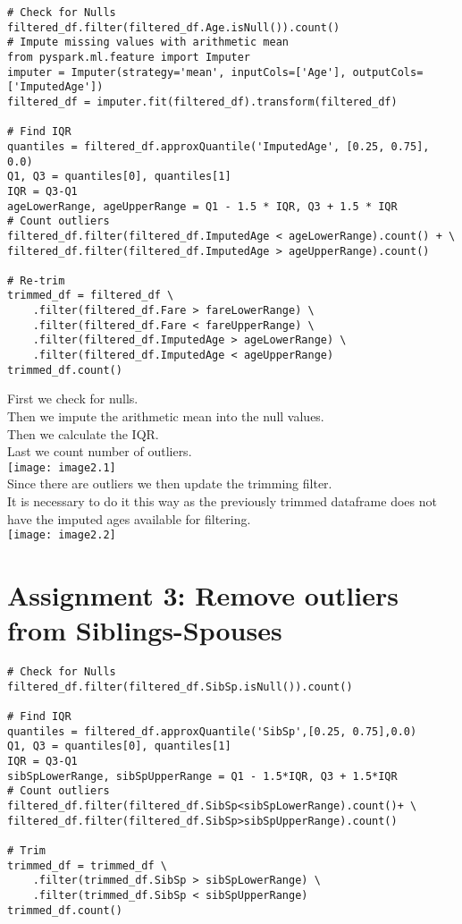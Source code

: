 \documentclass[]{article}
\begin{document}
\begin{verbatim}
# Check for Nulls
filtered_df.filter(filtered_df.Age.isNull()).count()
# Impute missing values with arithmetic mean
from pyspark.ml.feature import Imputer
imputer = Imputer(strategy='mean', inputCols=['Age'], outputCols=['ImputedAge'])
filtered_df = imputer.fit(filtered_df).transform(filtered_df)

# Find IQR 
quantiles = filtered_df.approxQuantile('ImputedAge', [0.25, 0.75], 0.0)
Q1, Q3 = quantiles[0], quantiles[1]
IQR = Q3-Q1
ageLowerRange, ageUpperRange = Q1 - 1.5 * IQR, Q3 + 1.5 * IQR
# Count outliers
filtered_df.filter(filtered_df.ImputedAge < ageLowerRange).count() + \
filtered_df.filter(filtered_df.ImputedAge > ageUpperRange).count()

# Re-trim
trimmed_df = filtered_df \
	.filter(filtered_df.Fare > fareLowerRange) \
	.filter(filtered_df.Fare < fareUpperRange) \
	.filter(filtered_df.ImputedAge > ageLowerRange) \
	.filter(filtered_df.ImputedAge < ageUpperRange)
trimmed_df.count()
\end{verbatim}
First we check for nulls. \\
Then we impute the arithmetic mean into the null values. \\
Then we calculate the IQR. \\
Last we count number of outliers. \vspace{1em} \\
\texttt{[image: image2.1]} \\

Since there are outliers we then update the trimming filter. \\
It is necessary to do it this way as the previously trimmed dataframe does not have the imputed ages available for filtering. \vspace{1em} \\
\texttt{[image: image2.2]}

\clearpage

\section*{Assignment 3: Remove outliers from Siblings-Spouses}

\begin{verbatim}
# Check for Nulls
filtered_df.filter(filtered_df.SibSp.isNull()).count()

# Find IQR 
quantiles = filtered_df.approxQuantile('SibSp',[0.25, 0.75],0.0)
Q1, Q3 = quantiles[0], quantiles[1]
IQR = Q3-Q1
sibSpLowerRange, sibSpUpperRange = Q1 - 1.5*IQR, Q3 + 1.5*IQR
# Count outliers
filtered_df.filter(filtered_df.SibSp<sibSpLowerRange).count()+ \
filtered_df.filter(filtered_df.SibSp>sibSpUpperRange).count()

# Trim
trimmed_df = trimmed_df \
	.filter(trimmed_df.SibSp > sibSpLowerRange) \
	.filter(trimmed_df.SibSp < sibSpUpperRange)
trimmed_df.count()
\end{verbatim}
\end{document}
